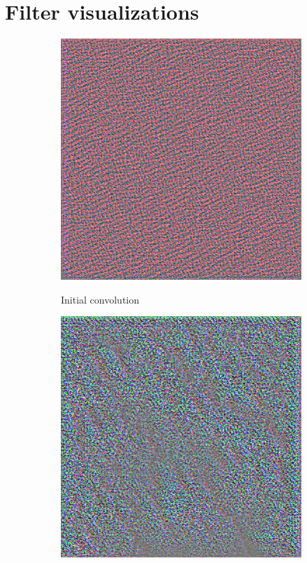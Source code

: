 \documentclass{kththesis}
\begin{document}
\section{Filter visualizations}
\begin{figure}[H]
  \begin{subfigure}{.5\textwidth}
    \centering
    \includegraphics[width=0.9\linewidth]{img/layer0.png}
    \label{fig:layer0}
    \caption{Initial convolution}
  \end{subfigure}%
  \begin{subfigure}{.5\textwidth}
    \centering
    \includegraphics[width=0.9\linewidth]{img/layer1.png}

\end{subfigure}
\end{figure}
\end{document}
